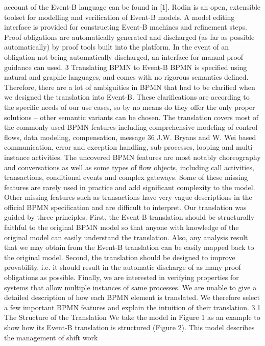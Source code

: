 account of the Event-B language can be found in [1].
Rodin is an open, extensible toolset for modelling and verification of Event-B
models. A model editing interface is provided for constructing Event-B machines
and refinement steps. Proof obligations are automatically generated and discharged (as far as possible automatically) by proof tools built into the platform.
In the event of an obligation not being automatically discharged, an interface
for manual proof guidance can used.
3 Translating BPMN to Event-B
BPMN is specified using natural and graphic languages, and comes with no
rigorous semantics defined. Therefore, there are a lot of ambiguities in BPMN
that had to be clarified when we designed the translation into Event-B. These
clarifications are according to the specific needs of our use cases, so by no means
do they offer the only proper solutions – other semantic variants can be chosen.
The translation covers most of the commonly used BPMN features including
comprehensive modeling of control flows, data modeling, compensation, message
36 J.W. Bryans and W. Wei
based communication, error and exception handling, sub-processes, looping and
multi-instance activities. The uncovered BPMN features are most notably choreography and conversations as well as some types of flow objects, including call
activities, transactions, conditional events and complex gateways. Some of these
missing features are rarely used in practice and add significant complexity to the
model. Other missing features such as transactions have very vague descriptions
in the official BPMN specification and are difficult to interpret.
Our translation was guided by three principles. First, the Event-B translation
should be structurally faithful to the original BPMN model so that anyone
with knowledge of the original model can easily understand the translation.
Also, any analysis result that we may obtain from the Event-B translation can
be easily mapped back to the original model. Second, the translation should be
designed to improve provability, i.e. it should result in the automatic discharge
of as many proof obligations as possible. Finally, we are interested in verifying
properties for systems that allow multiple instances of same processes.
We are unable to give a detailed description of how each BPMN element is
translated. We therefore select a few important BPMN features and explain the
intuition of their translation.
3.1 The Structure of the Translation
We take the model in Figure 1 as an example to show how its Event-B translation
is structured (Figure 2). This model describes the management of shift work
